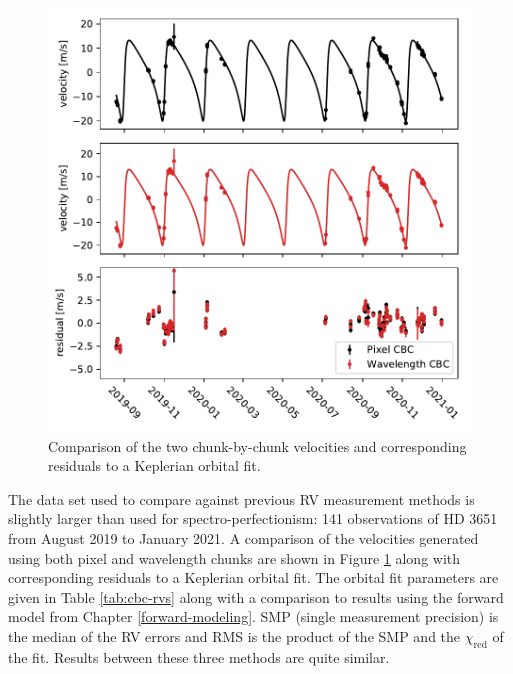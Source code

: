\begin{figure}
    \centering
    \includegraphics[width=\textwidth]{figures-5/cbc-comparison.pdf}
    \caption[Keplerian orbital fit comparison between chunk methods]{Comparison of the two chunk-by-chunk velocities and corresponding residuals to a Keplerian orbital fit.}
    \label{fig:cbc-comparison}
\end{figure}

The data set used to compare against previous RV measurement methods is slightly larger than used for spectro-perfectionism: 141 observations of HD 3651 from August 2019 to January 2021. A comparison of the velocities generated using both pixel and wavelength chunks are shown in Figure \ref{fig:cbc-comparison} along with corresponding residuals to a Keplerian orbital fit. The orbital fit parameters are given in Table \ref{tab:cbc-rvs} along with a comparison to results using the forward model from Chapter \ref{forward-modeling}. SMP (single measurement precision) is the median of the RV errors and RMS is the product of the SMP and the $\chi_\mathrm{red}$ of the fit. Results between these three methods are quite similar.


